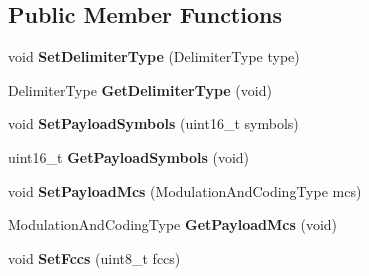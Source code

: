 \subsection*{\-Public \-Member \-Functions}
\begin{DoxyCompactItemize}
\item 
\hypertarget{classns3_1_1PLC__PhyRatelessFrameControlHeader_ab0775de943dcb4bd00e0f72e55327092}{void {\bfseries \-Set\-Delimiter\-Type} (\-Delimiter\-Type type)}\label{classns3_1_1PLC__PhyRatelessFrameControlHeader_ab0775de943dcb4bd00e0f72e55327092}

\item 
\hypertarget{classns3_1_1PLC__PhyRatelessFrameControlHeader_a5c8bcc700b247faae09b1e7fbfa42d31}{\-Delimiter\-Type {\bfseries \-Get\-Delimiter\-Type} (void)}\label{classns3_1_1PLC__PhyRatelessFrameControlHeader_a5c8bcc700b247faae09b1e7fbfa42d31}

\item 
\hypertarget{classns3_1_1PLC__PhyRatelessFrameControlHeader_a56eb6e7026b0a9153c5e9c4ef54f0194}{void {\bfseries \-Set\-Payload\-Symbols} (uint16\-\_\-t symbols)}\label{classns3_1_1PLC__PhyRatelessFrameControlHeader_a56eb6e7026b0a9153c5e9c4ef54f0194}

\item 
\hypertarget{classns3_1_1PLC__PhyRatelessFrameControlHeader_ac734747eac87035dbd55828f4414a65c}{uint16\-\_\-t {\bfseries \-Get\-Payload\-Symbols} (void)}\label{classns3_1_1PLC__PhyRatelessFrameControlHeader_ac734747eac87035dbd55828f4414a65c}

\item 
\hypertarget{classns3_1_1PLC__PhyRatelessFrameControlHeader_a4157a66183b1486c3438ca99c17c5d73}{void {\bfseries \-Set\-Payload\-Mcs} (\-Modulation\-And\-Coding\-Type mcs)}\label{classns3_1_1PLC__PhyRatelessFrameControlHeader_a4157a66183b1486c3438ca99c17c5d73}

\item 
\hypertarget{classns3_1_1PLC__PhyRatelessFrameControlHeader_aaca176b05b6b60c12d50e5e3d6bb0e25}{\-Modulation\-And\-Coding\-Type {\bfseries \-Get\-Payload\-Mcs} (void)}\label{classns3_1_1PLC__PhyRatelessFrameControlHeader_aaca176b05b6b60c12d50e5e3d6bb0e25}

\item 
\hypertarget{classns3_1_1PLC__PhyRatelessFrameControlHeader_ae05b93f46aa589cc9de54f7b41b4003c}{void {\bfseries \-Set\-Fccs} (uint8\-\_\-t fccs)}\label{classns3_1_1PLC__PhyRatelessFrameControlHeader_ae05b93f46aa589cc9de54f7b41b4003c}


\end{DoxyCompactItemize}
